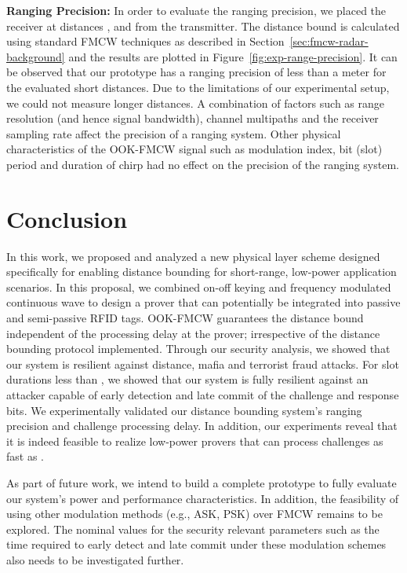 \documentclass{sig-alternate-10pt}
\newcommand{\eg}{e.g.,\xspace}
\begin{document}
\textbf{Ranging Precision:} In order to evaluate the ranging precision, we
placed the receiver at distances ,  and  from the transmitter.
The distance bound is calculated using standard FMCW techniques as described in
Section~\ref{sec:fmcw-radar-background} and the results are plotted in
Figure~\ref{fig:exp-range-precision}. It can be observed that our prototype has
a ranging precision of less than a meter for the evaluated short distances. Due
to the limitations of our experimental setup, we could not measure longer
distances. A combination of factors such as range resolution  (and
hence signal bandwidth), channel multipaths and the receiver sampling rate
affect the precision of a ranging system. Other physical characteristics of the
OOK-FMCW signal such as modulation index, bit (slot) period  and duration
of chirp  had no effect on the precision of the ranging system.

\section{Conclusion}
\label{sec:conclusion}

In this work, we proposed and analyzed a new physical layer scheme designed
specifically for enabling distance bounding for short-range, low-power
application scenarios. In this proposal, we combined on-off keying and frequency
modulated continuous wave to design a prover that can potentially be integrated
into passive and semi-passive RFID tags. OOK-FMCW guarantees the distance bound
independent of the processing delay at the prover; irrespective of the distance
bounding protocol implemented. Through our security analysis, we showed that our
system is resilient against distance, mafia and terrorist fraud attacks. For
slot durations less than , we showed that our system is fully
resilient against an attacker capable of early detection and late commit of the
challenge and response bits. We experimentally validated our distance bounding
system's ranging precision and challenge processing delay. In addition, our
experiments reveal that it is indeed feasible to realize low-power provers that
can process challenges as fast as .

As part of future work, we intend to build a complete prototype to fully
evaluate our system's power and performance characteristics. In addition, the
feasibility of using other modulation methods (\eg ASK, PSK) over FMCW remains
to be explored. The nominal values for the security relevant parameters such as
the time required to early detect and late commit under these modulation schemes
also needs to be investigated further.



\end{document}
